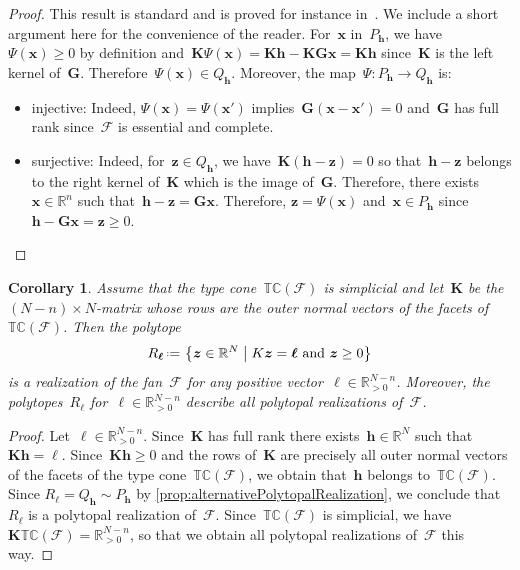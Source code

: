 \documentclass{amsart}
\newtheorem{corollary}[theorem]{Corollary}
\theoremstyle{definition}
\newcommand{\R}{\mathbb{R}} %
\renewcommand{\b}[1]{{\boldsymbol{#1}}} %
\newcommand{\set}[2]{\left\{ #1 \;\middle|\; #2 \right\}} %
\newcommand{\eqdef}{\mbox{\,\raisebox{0.2ex}{\scriptsize\ensuremath{\mathrm:}}\ensuremath{=}\,}} %
\newcommand{\Fan}{\mathcal{F}} %
\newcommand{\typeCone}{\mathbb{TC}} %
\begin{document}
\begin{proof}
This result is standard and is proved for instance in~\cite[Coro.~9.5.7]{DeLoeraRambauSantos}.
We include a short argument here for the convenience of the reader.
For~$\b{x}$ in~$P_\b{h}$, we have $\Psi(\b{x}) \ge 0$ by definition and~$\b{K}\Psi(\b{x}) = \b{K}\b{h} - \b{K}\b{G}\b{x} = \b{K}\b{h}$ since~$\b{K}$ is the left kernel of~$\b{G}$. Therefore~$\Psi(\b{x}) \in Q_\b{h}$.
Moreover, the map~$\Psi : P_\b{h} \to Q_\b{h}$ is:
\begin{itemize}
\item injective: Indeed, $\Psi(\b{x}) = \Psi(\b{x}')$ implies~$\b{G}(\b{x} - \b{x}') = 0$ and~$\b{G}$ has full rank since~$\Fan$ is essential and complete.
\item surjective: Indeed, for~$\b{z} \in Q_\b{h}$, we have~$\b{K}(\b{h}-\b{z}) = 0$ so that~$\b{h}-\b{z}$ belongs to the right kernel of~$\b{K}$ which is the image of~$\b{G}$. Therefore, there exists~$\b{x} \in \R^n$ such that~$\b{h}-\b{z} = \b{G}\b{x}$. Therefore, $\b{z} = \Psi(\b{x})$ and~$\b{x} \in P_\b{h}$ since~$\b{h} - \b{G}\b{x} = \b{z} \ge 0$.\qedhere
\end{itemize}
\end{proof}

\begin{corollary}
\label{coro:simplicialTypeCone}
Assume that the type cone~$\typeCone(\Fan)$ is simplicial and let~$\b{K}$ be the $(N-n) \times N$-matrix whose rows are the outer normal vectors of the facets of~$\typeCone(\Fan)$. Then the polytope
\[
R_\b{\ell} \eqdef \set{\b{z} \in \R^N}{K\b{z} = \b{\ell} \text{ and } \b{z} \ge 0}
\]
is a realization of the fan~$\Fan$ for any positive vector~$\b{\ell} \in \R_{>0}^{N-n}$.
Moreover, the polytopes~$R_\b{\ell}$ for~$\b{\ell} \in \R_{>0}^{N-n}$ describe all polytopal realizations of~$\Fan$.
\end{corollary}

\begin{proof}
Let~$\b{\ell} \in \R_{>0}^{N-n}$.
Since~$\b{K}$ has full rank there exists~$\b{h} \in \R^N$ such that~$\b{K}\b{h} = \b{\ell}$.
Since~$\b{K}\b{h} \ge 0$ and the rows of~$\b{K}$ are precisely all outer normal vectors of the facets of the type cone~$\typeCone(\Fan)$, we obtain that~$\b{h}$ belongs to~$\typeCone(\Fan)$.
Since $R_\b{\ell} = Q_\b{h} \sim P_\b{h}$ by \cref{prop:alternativePolytopalRealization}, we conclude that~$R_\b{\ell}$ is a polytopal realization of~$\Fan$.
Since~$\typeCone(\Fan)$ is simplicial, we have~$\b{K}\typeCone(\Fan) = \R_{>0}^{N-n}$, so that we obtain all polytopal realizations of~$\Fan$ this way.
\end{proof}
\end{document}
